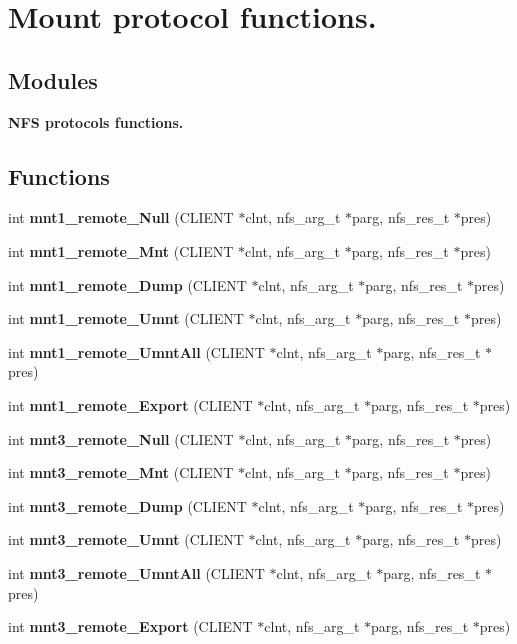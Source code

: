 \section{Mount protocol functions.}
\label{group__MNTprocs}
\subsection*{Modules}
\begin{CompactItemize}
\item 
{\bf NFS protocols functions.}
\end{CompactItemize}
\subsection*{Functions}
\begin{CompactItemize}
\item 
int {\bf mnt1\_\-remote\_\-Null} (CLIENT $\ast$clnt, nfs\_\-arg\_\-t $\ast$parg, nfs\_\-res\_\-t $\ast$pres)
\item 
int {\bf mnt1\_\-remote\_\-Mnt} (CLIENT $\ast$clnt, nfs\_\-arg\_\-t $\ast$parg, nfs\_\-res\_\-t $\ast$pres)
\item 
int {\bf mnt1\_\-remote\_\-Dump} (CLIENT $\ast$clnt, nfs\_\-arg\_\-t $\ast$parg, nfs\_\-res\_\-t $\ast$pres)
\item 
int {\bf mnt1\_\-remote\_\-Umnt} (CLIENT $\ast$clnt, nfs\_\-arg\_\-t $\ast$parg, nfs\_\-res\_\-t $\ast$pres)
\item 
int {\bf mnt1\_\-remote\_\-UmntAll} (CLIENT $\ast$clnt, nfs\_\-arg\_\-t $\ast$parg, nfs\_\-res\_\-t $\ast$pres)
\item 
int {\bf mnt1\_\-remote\_\-Export} (CLIENT $\ast$clnt, nfs\_\-arg\_\-t $\ast$parg, nfs\_\-res\_\-t $\ast$pres)
\item 
int {\bf mnt3\_\-remote\_\-Null} (CLIENT $\ast$clnt, nfs\_\-arg\_\-t $\ast$parg, nfs\_\-res\_\-t $\ast$pres)
\item 
int {\bf mnt3\_\-remote\_\-Mnt} (CLIENT $\ast$clnt, nfs\_\-arg\_\-t $\ast$parg, nfs\_\-res\_\-t $\ast$pres)
\item 
int {\bf mnt3\_\-remote\_\-Dump} (CLIENT $\ast$clnt, nfs\_\-arg\_\-t $\ast$parg, nfs\_\-res\_\-t $\ast$pres)
\item 
int {\bf mnt3\_\-remote\_\-Umnt} (CLIENT $\ast$clnt, nfs\_\-arg\_\-t $\ast$parg, nfs\_\-res\_\-t $\ast$pres)
\item 
int {\bf mnt3\_\-remote\_\-UmntAll} (CLIENT $\ast$clnt, nfs\_\-arg\_\-t $\ast$parg, nfs\_\-res\_\-t $\ast$pres)
\item 
int {\bf mnt3\_\-remote\_\-Export} (CLIENT $\ast$clnt, nfs\_\-arg\_\-t $\ast$parg, nfs\_\-res\_\-t $\ast$pres)
\end{CompactItemize}


